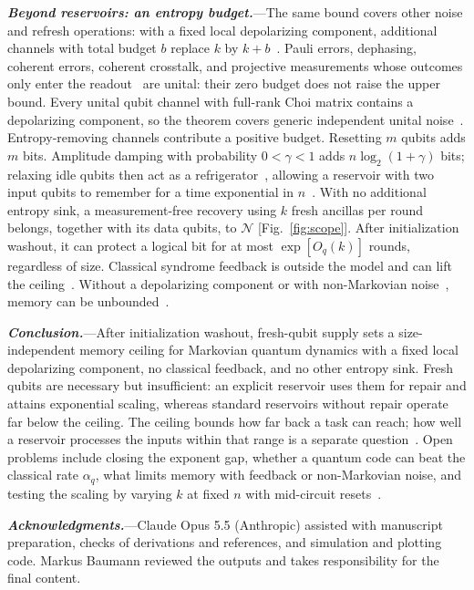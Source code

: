 \documentclass[aps,prl,twocolumn,superscriptaddress,floatfix]{revtex4-2}
\theoremstyle{plain}
\newcommand{\runin}[1]{\textit{\textbf{#1}}---}
\begin{document}
\runin{Beyond reservoirs: an entropy budget.}The same bound covers other noise and refresh operations: with a fixed local depolarizing component, additional channels with total budget $b$ replace $k$ by $k+b$~\cite[Sec.~VI]{SM}. Pauli errors, dephasing, coherent errors, coherent crosstalk, and projective measurements whose outcomes only enter the readout~\cite{Mujal2023} are unital: their zero budget does not raise the upper bound. Every unital qubit channel with full-rank Choi matrix contains a depolarizing component, so the theorem covers generic independent unital noise~\cite[Sec.~VI]{SM}. Entropy-removing channels contribute a positive budget. Resetting $m$ qubits adds $m$ bits. Amplitude damping with probability $0<\gamma<1$ adds $n\log_2(1+\gamma)$ bits; relaxing idle qubits then act as a refrigerator~\cite{BenOr2013}, allowing a reservoir with two input qubits to remember for a time exponential in $n$~\citetext{\citealp[Sec.~VI]{SM}; \citealp{Hoeffding1963}}. With no additional entropy sink, a measurement-free recovery using $k$ fresh ancillas per round belongs, together with its data qubits, to $\mathcal N$ [Fig.~\ref{fig:scope}]. After initialization washout, it can protect a logical bit for at most $\exp[O_q(k)]$ rounds, regardless of size. Classical syndrome feedback is outside the model and can lift the ceiling~\cite[Sec.~VI]{SM}. Without a depolarizing component or with non-Markovian noise~\cite{Sannia2026}, memory can be unbounded~\cite[Sec.~VI]{SM}.

\runin{Conclusion.}After initialization washout, fresh-qubit supply sets a size-independent memory ceiling for Markovian quantum dynamics with a fixed local depolarizing component, no classical feedback, and no other entropy sink. Fresh qubits are necessary but insufficient: an explicit reservoir uses them for repair and attains exponential scaling, whereas standard reservoirs without repair operate far below the ceiling. The ceiling bounds how far back a task can reach; how well a reservoir processes the inputs within that range is a separate question~\cite{Cao2026}. Open problems include closing the exponent gap, whether a quantum code can beat the classical rate $\alpha_q$, what limits memory with feedback or non-Markovian noise, and testing the scaling by varying $k$ at fixed $n$ with mid-circuit resets~\cite{Yasuda2023,Hu2024}.

\begin{acknowledgments}
\runin{Acknowledgments.}Claude Opus 5.5 (Anthropic) assisted with manuscript preparation, checks of derivations and references, and simulation and plotting code. Markus Baumann reviewed the outputs and takes responsibility for the final content.
\end{acknowledgments}
\end{document}
